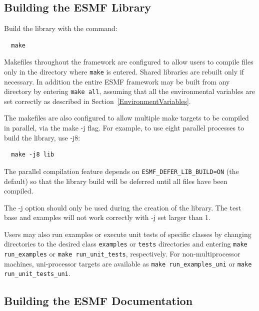 \subsection{Building the ESMF Library}
\label{BuildESMF}



Build the library with the command:
\begin{verbatim}
  make
\end{verbatim}


Makefiles throughout the framework are configured to allow users to
compile files only in the directory where {\tt make} is entered. Shared
libraries are rebuilt only if necessary. In addition the entire ESMF
framework may be built from any directory by entering {\tt make all},
assuming that all the environmental variables are set correctly as
described in Section~\ref{EnvironmentVariables}.

The makefiles are also configured to allow multiple make targets to be
compiled in parallel, via the make -j flag.  For example, to use eight
parallel processes to build the library, use -j8:
\begin{verbatim}
  make -j8 lib
\end{verbatim}

The parallel compilation feature depends on {\tt ESMF\_DEFER\_LIB\_BUILD=ON}
(the default) so that the library build will be deferred until all files
have been compiled.

The -j option should only be used during the creation of the library.
The test base and examples will not work correctly with -j set larger
than 1.

Users may also run examples or execute unit tests of specific classes
by changing directories to the desired class {\tt examples} or {\tt tests}
directories and entering {\tt make run\_examples} or
{\tt make run\_unit\_tests}, respectively.  For non-multiprocessor machines,
uni-processor targets are available as {\tt make run\_examples\_uni} or
{\tt make run\_unit\_tests\_uni}.

\subsection{Building the ESMF Documentation}
\label{BuildDocumentation}

